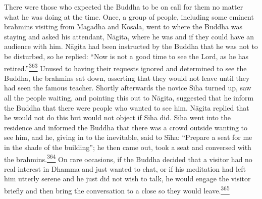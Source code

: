 There were those who expected the Buddha to be on call for them no
matter what he was doing at the time. Once, a group of people, including
some eminent brahmins visiting from Magadha and Kosala, went to where
the Buddha was staying and asked his attendant, Nāgita, where he was and
if they could have an audience with him. Nāgita had been instructed by
the Buddha that he was not to be disturbed, so he replied: ``Now is not
a good time to see the Lord, as he has
retired.''\label{footprints_split_011.html_fnref363}\hyperref[footprints_split_024.htmlux5cux23fn363]{\textsuperscript{363}}
Unused to having their requests ignored and determined to see the
Buddha, the brahmins sat down, asserting that they would not leave until
they had seen the famous teacher. Shortly afterwards the novice Sīha
turned up, saw all the people waiting, and pointing this out to Nāgita,
suggested that he inform the Buddha that there were people who wanted to
see him. Nāgita replied that he would not do this but would not object
if Sīha did. Sīha went into the residence and informed the Buddha that
there was a crowd outside wanting to see him, and he, giving in to the
inevitable, said to Sīha: ``Prepare a seat for me in the shade of the
building''; he then came out, took a seat and conversed with the
brahmins.\label{footprints_split_011.html_fnref364}\hyperref[footprints_split_024.htmlux5cux23fn364]{\textsuperscript{364}}
On rare occasions, if the Buddha decided that a visitor had no real
interest in Dhamma and just wanted to chat, or if his meditation had
left him utterly serene and he just did not wish to talk, he would
engage the visitor briefly and then bring the conversation to a close so
they would
leave.\label{footprints_split_011.html_fnref365}\hyperref[footprints_split_024.htmlux5cux23fn365]{\textsuperscript{365}}

